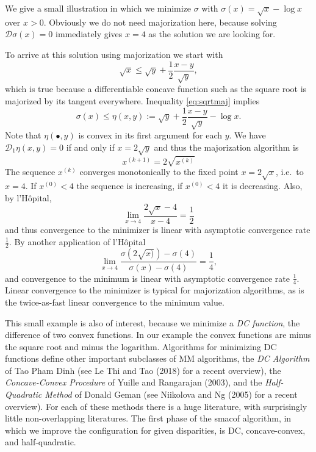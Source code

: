 \documentclass[
  12pt,
]{article}
\begin{document}
We give a small illustration in which we minimize \(\sigma\) with
\(\sigma(x)=\sqrt{x}-\log{x}\) over \(x>0\). Obviously we do not need
majorization here, because solving \(\mathcal{D}\sigma(x)=0\) immediately
gives \(x=4\) as the solution we are looking for.

To arrive at this solution using majorization we start with
\begin{equation}
\sqrt{x}\leq\sqrt{y}+\frac12\frac{x-y}{\sqrt{y}},
\label{eq:sqrtmaj}
\end{equation} which is true because a differentiable concave function
such as the square root is majorized by its tangent everywhere.
Inequality \eqref{eq:sqrtmaj} implies \begin{equation}
\sigma(x)\leq\eta(x,y):=\sqrt{y}+\frac12\frac{x-y}{\sqrt{y}}-\log{x}.
\label{eq:examplemaj}
\end{equation} Note that \(\eta(\bullet,y)\) is convex in its first
argument for each \(y\). We have \(\mathcal{D}_1\eta(x,y)=0\) if and only if
\(x=2\sqrt{y}\) and thus the majorization algorithm is \begin{equation}
x^{(k+1)}=2\sqrt{x^{(k)}}
\label{eq:examplealg}
\end{equation} The sequence \(x^{(k)}\) converges monotonically to the
fixed point \(x=2\sqrt{x}\), i.e.~to \(x=4\). If \(x^{(0)}<4\) the sequence is
increasing, if \(x^{(0)}<4\) it is decreasing. Also, by l'Hôpital,
\begin{equation}
\lim_{x\rightarrow 4}\frac{2\sqrt{x}-4}{x-4}=\frac12
\label{eq:hopi1}
\end{equation} and thus convergence to the minimizer is linear with
asymptotic convergence rate \(\frac12\). By another application of
l'Hôpital \begin{equation}
\lim_{x\rightarrow 4}\frac{\sigma(2\sqrt{x)})-\sigma(4)}{\sigma(x)-\sigma(4)}=\frac14,
\label{eq:hopi2}
\end{equation} and convergence to the minimum is linear with asymptotic
convergence rate \(\frac14\). Linear convergence to the minimizer is
typical for majorization algorithms, as is the twice-as-fast linear
convergence to the minimum value.

This small example is also of interest, because we minimize a \emph{DC
function}, the difference of two convex functions. In our example the
convex functions are minus the square root and minus the logarithm.
Algorithms for minimizing DC functions define other important subclasses
of MM algorithms, the \emph{DC Algorithm} of Tao Pham Dinh (see Le Thi and Tao (2018)
for a recent overview), the \emph{Concave-Convex Procedure} of
Yuille and Rangarajan (2003), and the \emph{Half-Quadratic Method} of Donald Geman
(see Niikolova and Ng (2005) for a recent overview). For each of these methods
there is a huge literature, with surprisingly little non-overlapping
literatures. The first phase of the smacof algorithm, in which we
improve the configuration for given disparities, is DC, concave-convex,
and half-quadratic.
\end{document}
